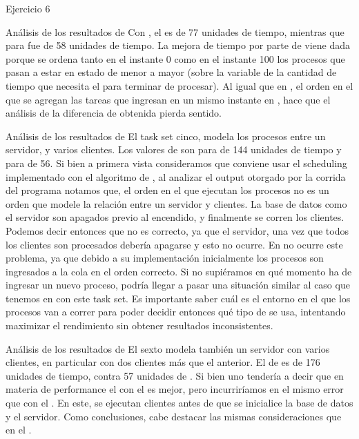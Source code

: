 \begin{section}{Ejercicio 6}
\begin{subsection}{Análisis de los resultados de }
	Con , el  es de 77 unidades de tiempo, mientras que para  fue de 58 unidades de tiempo. La mejora de tiempo por parte de  viene dada porque se ordena tanto en el instante 0 como en el instante 100 los procesos que pasan a estar en estado  de menor a mayor (sobre la variable de la cantidad de tiempo que necesita el  para terminar de procesar). Al igual que en , el orden en el que se agregan las tareas que ingresan en un mismo instante en , hace que el análisis de la diferencia de  obtenida pierda sentido.
\end{subsection}

\begin{subsection}{Análisis de los resultados de }
	El task set cinco, modela los procesos entre un servidor, y varios clientes. Los valores de  son para  de 144 unidades de tiempo y para  de 56. Si bien a primera vista consideramos que conviene usar el scheduling implementado con el algoritmo de , al analizar el output otorgado por la corrida del programa notamos que, el orden en el que ejecutan los procesos no es un orden que modele la relación entre un servidor y clientes. La base de datos como el servidor son apagados previo al encendido, y finalmente se corren los clientes. Podemos decir entonces que no es correcto, ya que el servidor, una vez que todos los clientes son procesados debería apagarse y esto no ocurre. 
	En  no ocurre este problema, ya que debido a su implementación inicialmente los procesos son ingresados a la cola en el orden correcto. Si no supiéramos en qué momento ha de ingresar un nuevo proceso, podría llegar a pasar una situación similar al caso que tenemos en  con este task set.
	Es importante saber cuál es el entorno en el que los procesos van a correr para poder decidir entonces qué tipo de  se usa, intentando maximizar el rendimiento sin obtener resultados inconsistentes.
\end{subsection}

\begin{subsection}{Análisis de los resultados de }
	El sexto  modela también un servidor con varios clientes, en particular con dos clientes más que el  anterior. El  de  es de 176 unidades de tiempo, contra 57 unidades de . Si bien uno tendería a decir que en materia de performance el  con el   es mejor, pero incurriríamos en el mismo error que con el . En este, se ejecutan clientes antes de que se inicialice la base de datos y el servidor. Como conclusiones, cabe destacar las mismas consideraciones que en el .
\end{subsection}

\end{section}

